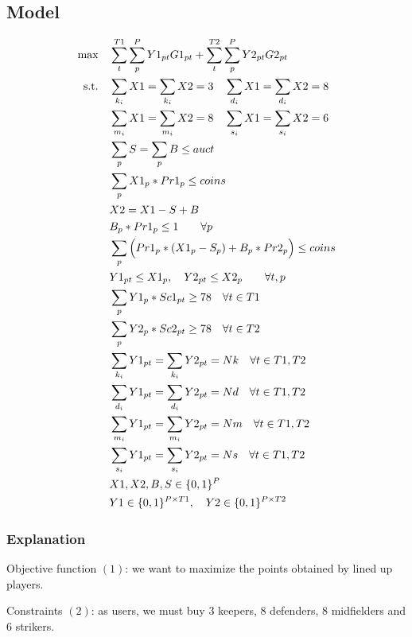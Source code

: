 \documentclass[a4paper,10pt]{article}
\theoremstyle{definition}
\theoremstyle{plain}
\begin{document}
\subsection{Model}

\begin{align}
	\text{max} \quad & \sum_{t}^{T1} \sum_{p}^{P} Y1_{pt} G1_{pt} +  \sum_{t}^{T2} \sum_{p}^{P} Y2_{pt} G2_{pt} \\
	\text{s.t.} \quad & \sum_{k_{i}} X1 = \sum_{k_{i}} X2 = 3 \quad \sum_{d_{i}} X1 = \sum_{d_{i}} X2 = 8\\
	& \sum_{m_{i}} X1 = \sum_{m_{i}} X2 = 8 \quad \sum_{s_{i}} X1 = \sum_{s_{i}} X2 = 6 \notag \\
	& \sum_{p} S = \sum_{p} B \leq auct	\\
	& \sum_{p} X1_p * Pr1_p \leq coins	\\
	&	X2 = X1 - S + B \\
	& B_p * Pr1_p \leq 1 \qquad \forall p \\
	& \sum_{p} \Big( Pr1_p * (X1_p - S_p) + B_p * Pr2_p \Big) \leq coins \\
	& Y1_{pt}  \leq X1_p, \quad  Y2_{pt}  \leq X2_p \qquad \forall t,p \\
	& \sum_{p} Y1_p * Sc1_{pt} \geq 78 \quad \forall t \in T1 \\
	& \sum_{p} Y2_p * Sc2_{pt} \geq 78 \quad \forall t \in T2 \notag \\
	& \sum_{k_{i}} Y1_{pt} = \sum_{k_{i}} Y2_{pt} = Nk \quad \forall t \in T1, T2 \\
	& \sum_{d_{i}} Y1_{pt} = \sum_{d_{i}} Y2_{pt} = Nd \quad \forall t \in T1, T2 \notag \\
	& \sum_{m_{i}} Y1_{pt} = \sum_{m_{i}} Y2_{pt} = Nm \quad \forall t \in T1, T2 \notag \\
	& \sum_{s_{i}} Y1_{pt} = \sum_{s_{i}} Y2_{pt} = Ns \quad \forall t \in T1, T2 \notag \\
	& X1, X2, B, S \in \{0,1\}^{P} \\
	&Y1 \in \{0,1\}^{P \times T1}, \quad  Y2 \in \{0,1\}^{P \times T2}
\end{align}

\subsubsection{Explanation}

Objective function $(1)$: we want to maximize the points obtained by lined up players.

Constraints $(2)$: as users, we must buy 3 keepers, 8 defenders, 8 midfielders and 6 strikers.
\end{document}
